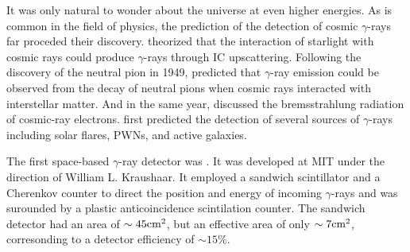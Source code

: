It was only natural to wonder about the universe at even higher energies.
As is common in the field of physics, the prediction of
the detection of cosmic $\gamma$-rays far proceded their discovery.
\cite{feenberg_1948_interaction-cosmic-ray} theorized that the interaction
of starlight with cosmic rays could produce $\gamma$-rays through
\ac{IC} upscattering.  Following the discovery of the neutral
pion in 1949, \cite{hayakawa_1952_propagation-cosmic}
predicted that $\gamma$-ray emission could be observed from the
decay of neutral pions when cosmic rays interacted with interstellar
matter.  And in the same year, \cite{hutchinson_1952_possible-relation}
discussed the bremsstrahlung radiation of cosmic-ray electrons.
\cite{morrison_1958_gamma-ray-astronomy} first predicted the detection
of several sources of $\gamma$-rays including solar flares, \acp{PWN},
and active galaxies.

    



The first space-based $\gamma$-ray detector was \explorerxi
\cite{kraushaar_1965_explorer-experiment}.  It was developed at \ac{MIT}
under the direction of William L. Kraushaar.  It employed a sandwich
scintillator and a Cherenkov counter to direct the position and energy
of incoming $\gamma$-rays and was surounded by a plastic anticoincidence
scintilation counter. The sandwich detector had an area of $\sim45\text{cm}^2$,
but an effective area of only $\sim 7\text{cm}^2$, corresonding
to a detector efficiency of $\sim 15\%$.

